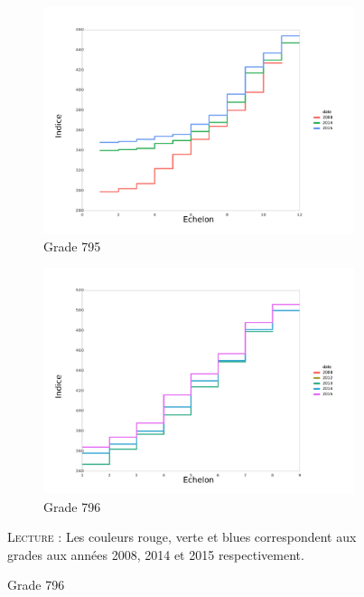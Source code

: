 \documentclass[11pt,a4paper]{article}
\begin{document}
\begin{figure}[ht]
\begin{subfigure}[b]{0.55\linewidth}
        \caption{Grade 795} 
    \label{echelon_by_neg_2} 
    \centering
    \includegraphics[width=1\linewidth]{AT_795_grille_by_neg.pdf} 
  \end{subfigure}%
  \begin{subfigure}[b]{0.55\linewidth}
        \caption{Grade 796} 
    \label{echelon_by_neg_3} 
    \centering
    \includegraphics[width=1\linewidth]{AT_796_grille_by_neg.pdf} 
  \end{subfigure} 
 \begin{minipage}{15cm}
 \footnotesize
 \textsc{Lecture : }Les couleurs rouge, verte et blues correspondent aux grades aux années 2008, 2014 et 2015 respectivement. 
 
 \end{minipage}
\end{figure}
\end{document}
